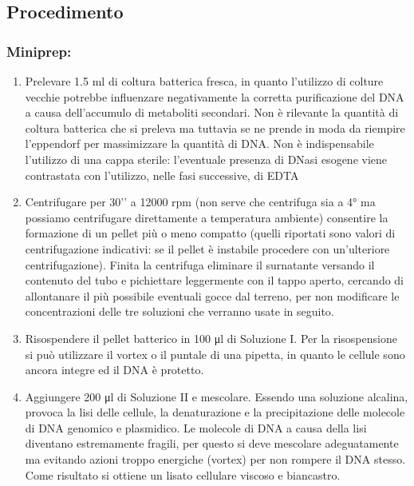 \subsection{Procedimento}

\subsubsection{Miniprep: }

\begin{enumerate}
  \item Prelevare 1.5 ml di coltura batterica fresca, in quanto l’utilizzo di colture vecchie potrebbe
	influenzare negativamente la corretta purificazione del DNA a causa dell’accumulo di metaboliti secondari.
	Non è rilevante la quantità di coltura batterica che si preleva ma tuttavia se ne prende in moda da riempire
	l’eppendorf per massimizzare la quantità di DNA. Non è indispensabile l’utilizzo di una cappa sterile:
	l’eventuale presenza di DNasi esogene viene contrastata con l’utilizzo, nelle fasi successive, di EDTA
  \item Centrifugare per 30’’ a 12000 rpm (non serve che centrifuga sia a 4° ma possiamo centrifugare direttamente
	a temperatura ambiente) consentire la formazione di un pellet più o meno
	compatto (quelli riportati sono valori di centrifugazione indicativi: se il pellet è instabile procedere
	con un’ulteriore centrifugazione). Finita la centrifuga eliminare il surnatante versando il contenuto del tubo e
	pichiettare leggermente con il tappo aperto, cercando di allontanare il più possibile eventuali gocce dal terreno,
	per non modificare le concentrazioni delle tre soluzioni che verranno usate in seguito.

  \item Risospendere il pellet batterico in 100 μl di Soluzione I. Per la risospensione si può utilizzare il vortex o
	il puntale di una pipetta, in quanto le cellule sono ancora integre ed il DNA è protetto.

  \item Aggiungere 200 μl di Soluzione II e mescolare. Essendo una soluzione alcalina, provoca la lisi delle cellule,
	la denaturazione e la  precipitazione delle molecole di DNA genomico e plasmidico.
	Le molecole di DNA a causa della lisi diventano estremamente fragili, per questo si deve mescolare
	adeguatamente ma evitando azioni troppo energiche (vortex) per non rompere il DNA stesso.
	Come risultato si ottiene un lisato cellulare viscoso e biancastro.


\end{enumerate}

